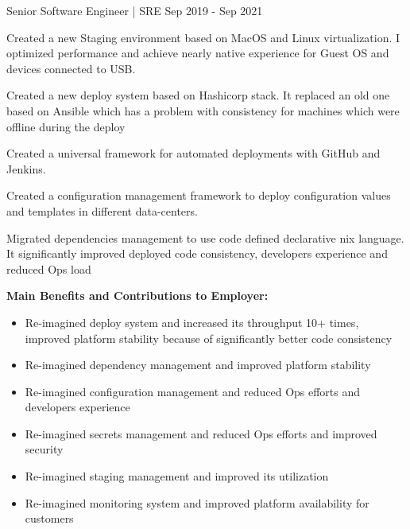 \begin{cventries}
    \cventry
    {Senior Software Engineer | SRE} %
    {} %
    {} %
    {Sep 2019 - Sep 2021} %
    {
      \begin{cvitems} %
        \item {Created a new Staging environment based on MacOS and Linux virtualization. I optimized performance and achieve nearly native experience for Guest OS and devices connected to USB.}
        \item {Created a new deploy system based on Hashicorp stack. It replaced an old one based on Ansible which has a problem with consistency for machines which were offline during the deploy}
        \item {Created a universal framework for automated deployments with GitHub and Jenkins.}
        \item {Created a configuration management framework to deploy configuration values and templates in different data-centers.}
        \item {Migrated dependencies management to use code defined declarative nix language. It significantly improved deployed code consistency, developers experience and reduced Ops load}
      \end{cvitems}
    }

\end{cventries}

\begin{cvparagraph}

\textbf{Main Benefits and Contributions to Employer:}

\begin{itemize}
  \item Re-imagined deploy system and increased its throughput 10+ times, improved platform stability because of significantly better code consistency
  \item Re-imagined dependency management and improved platform stability
  \item Re-imagined configuration management and reduced Ops efforts and developers experience
  \item Re-imagined secrets management and reduced Ops efforts and improved security
  \item Re-imagined staging management and improved its utilization
  \item Re-imagined monitoring system and improved platform availability for customers
\end{itemize}

\end{cvparagraph}



